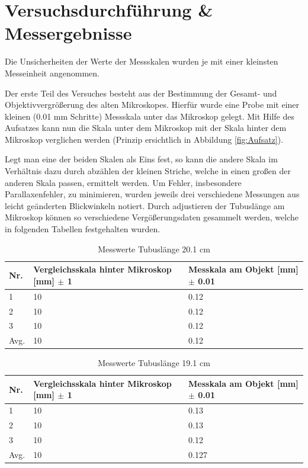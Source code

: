 \documentclass[12pt,a4paper,twoside]{article}
\begin{document}
\section{Versuchsdurchführung \& Messergebnisse} %

Die Unsicherheiten der Werte der Messskalen wurden je mit einer kleinsten Messeinheit angenommen. \newline

\noindent
Der erste Teil des Versuches besteht aus der Bestimmung der Gesamt- und Objektivvergrößerung des alten Mikroskopes.
Hierfür wurde eine Probe mit einer kleinen (0.01 mm Schritte) Messskala unter das Mikroskop gelegt. 
Mit Hilfe des Aufsatzes kann nun die Skala unter dem Mikroskop mit der Skala hinter dem Mikroskop verglichen werden (Prinzip ersichtlich in Abbildung \ref{fig:Aufsatz}). \newline

\noindent
Legt man eine der beiden Skalen als Eins fest, so kann die andere Skala im Verhältnis dazu durch abzählen der kleinen Striche, welche in einen großen der anderen Skala passen, ermittelt werden.
Um Fehler, insbesondere Parallaxenfehler, zu minimieren, wurden jeweils drei verschiedene Messungen aus leicht geänderten Blickwinkeln notiert.
Durch adjustieren der Tubuslänge am Mikroskop können so verschiedene Vergößerungsdaten gesammelt werden, welche in folgenden Tabellen festgehalten wurden.

\begin{table}[H]
    \centering
    \caption{Messwerte Tubuslänge 20.1 cm}
    \label{tab:messwerteTB20}
    \begin{tabular}{| l | l | l |}
        \hline
        Nr.   & Vergleichsskala hinter Mikroskop [mm] $\pm$ 1  & Messkala am Objekt [mm] $\pm$ 0.01 \\
        \hline
        1 & 10 & 0.12 \\
        2 & 10 & 0.12 \\
        3 & 10 & 0.12 \\
        \hline
        Avg. & 10 & 0.12 \\
        \hline
    \end{tabular}
\end{table}

\begin{table}[H]
    \centering
    \caption{Messwerte Tubuslänge 19.1 cm}
    \label{tab:messwerteTB19}
    \begin{tabular}{| l | l | l |}
        \hline
        Nr.   & Vergleichsskala hinter Mikroskop [mm] $\pm$ 1 & Messkala am Objekt [mm] $\pm$ 0.01 \\
        \hline
        1 & 10 & 0.13 \\
        2 & 10 & 0.13 \\
        3 & 10 & 0.12 \\
        \hline
        Avg. & 10 & 0.127 \\
        \hline
    \end{tabular}
\end{table}
\end{document}
